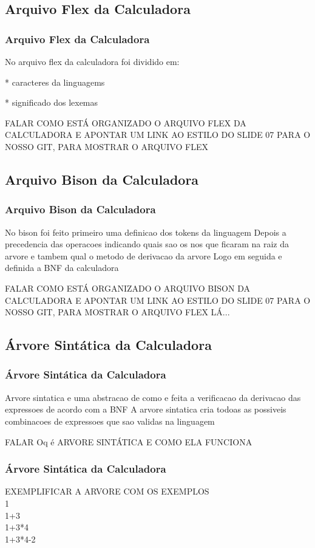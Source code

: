 \documentclass{beamer}
\begin{document}
\subsection{Arquivo Flex da Calculadora}

\begin{frame}
\frametitle{Arquivo Flex da Calculadora}
	No arquivo flex da calculadora foi dividido em:
	\item<1-> * caracteres da linguagems
	\item<2-> * significado dos lexemas 
	
FALAR COMO ESTÁ ORGANIZADO O ARQUIVO FLEX DA CALCULADORA E APONTAR UM LINK AO ESTILO DO SLIDE 07 PARA O NOSSO GIT, PARA MOSTRAR
O ARQUIVO FLEX


\end{frame}

\subsection{Arquivo Bison da Calculadora}
	
\begin{frame}
\frametitle{Arquivo Bison da Calculadora}
	No bison foi feito primeiro uma definicao dos tokens da linguagem 
	Depois a precedencia das operacoes indicando quais sao os nos que ficaram na raiz da arvore
	e tambem qual o metodo de derivacao da arvore
	Logo em seguida e definida a BNF da calculadora
	
FALAR COMO ESTÁ ORGANIZADO O ARQUIVO BISON DA CALCULADORA E APONTAR UM LINK AO ESTILO DO SLIDE 07 PARA O NOSSO GIT, PARA MOSTRAR
O ARQUIVO FLEX LÁ...

\end{frame}

\subsection{Árvore Sintática da Calculadora }
\begin{frame}
\frametitle{Árvore Sintática da Calculadora }
	Arvore sintatica e uma abstracao de como e feita a verificacao da derivacao das expressoes de acordo com a BNF
	A arvore sintatica cria todoas as possiveis combinacoes de expressoes que sao validas na linguagem
	
FALAR Oq é ARVORE SINTÁTICA E COMO ELA FUNCIONA

\end{frame}

\begin{frame}
\frametitle{Árvore Sintática da Calculadora }

EXEMPLIFICAR A ARVORE COM OS EXEMPLOS 
\\ 1
\\ 1+3
\\ 1+3*4
\\ 1+3*4-2

\end{frame}
\end{document}
